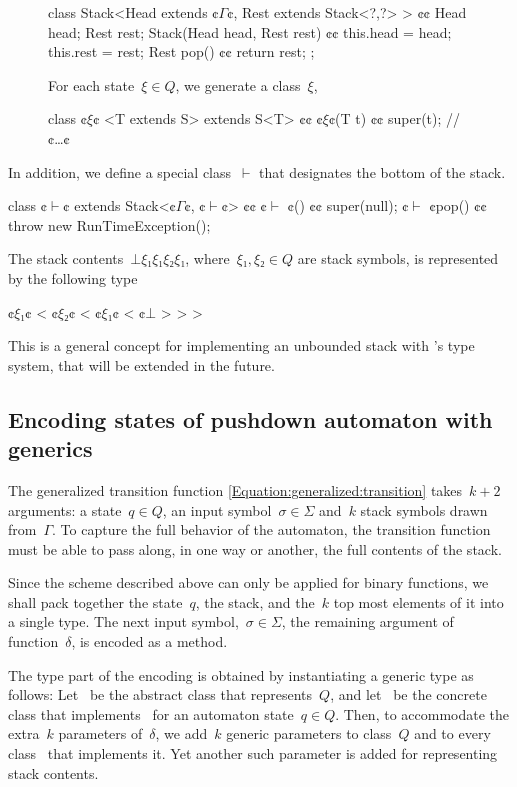 \begin{figure}
\begin{JAVA}
class Stack<Head extends ¢$Γ$¢, Rest extends Stack<?,?> > {¢¢
  Head head;
  Rest rest;
  Stack(Head head, Rest rest) {¢¢ this.head = head; this.rest = rest;}
  Rest pop() {¢¢ return rest; };
}
\end{JAVA}
For each state~$ξ∈Q$, we generate a \Java class~$ξ$,
\begin{JAVA}
class ¢$ξ$¢ <T extends S> extends S<T> {¢¢
  ¢$ξ$¢(T t) {¢¢ super(t); }
  // ¢…¢
}
\end{JAVA}
\end{figure}
In addition, we define a special class~$\vdash$ that designates the bottom of the stack.
\begin{JAVA}
class ¢$\vdash$¢ extends Stack<¢$Γ$¢, ¢$\vdash$¢> {¢¢
  ¢$\vdash$ ¢() {¢¢ super(null); }
  ¢$\vdash$ ¢pop() {¢¢ throw new RunTimeException(); }
}
\end{JAVA}
The stack contents~$⊥ξ₁ξ₁ξ₂ξ₁$,
where~$ξ₁,ξ₂∈Q$ are stack symbols,
is represented by the following type
\begin{JAVA}
  ¢$ξ₁$¢ < ¢$ξ₂$¢ < ¢$ξ₁$¢ < ¢$⊥$ > > >
\end{JAVA}
This is a general concept for implementing an unbounded stack with \Java's type system,
that will be extended in the future.


\subsection{Encoding states of pushdown automaton with \Java generics}
The generalized transition function \cref{Equation:generalized:transition}
  takes~$k+2$ arguments: a state~$q∈Q$, an input symbol~$σ∈Σ$
    and~$k$ stack symbols drawn from~$Γ$.
To capture the full behavior of the automaton, the transition function
  must be able to pass along, in one way or another, the full contents of the stack.

Since the scheme described above can only be applied for binary functions,
  we shall pack together the state~$q$, the stack, and the~$k$ top most
  elements of it into a single type.
The next input symbol,~$σ∈Σ$, the remaining argument of function~$δ$,
  is encoded as a method.

The type part of the encoding is obtained by instantiating a generic type as follows:
Let~ be the abstract class that represents~$Q$, and let~ be the concrete class that
  implements~ for an automaton state~$q∈Q$.
Then, to accommodate the extra~$k$ parameters of~$δ$, we add~$k$ generic parameters
  to class~$Q$ and to every class~ that implements it.
Yet another such parameter is added for representing stack contents.


